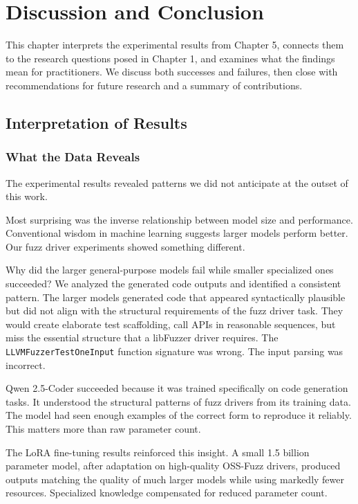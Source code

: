 
\chapter{Discussion and Conclusion}
\label{chap:discussion}

This chapter interprets the experimental results from Chapter 5, connects them to the research questions posed in Chapter 1, and examines what the findings mean for practitioners. We discuss both successes and failures, then close with recommendations for future research and a summary of contributions.


\section{Interpretation of Results}
\label{sec:discussion_interpretation}

\subsection{What the Data Reveals}
\label{sec:discussion_data}

The experimental results revealed patterns we did not anticipate at the outset of this work.

Most surprising was the inverse relationship between model size and performance. Conventional wisdom in machine learning suggests larger models perform better. Our fuzz driver experiments showed something different.

Why did the larger general-purpose models fail while smaller specialized ones succeeded? We analyzed the generated code outputs and identified a consistent pattern. The larger models generated code that appeared syntactically plausible but did not align with the structural requirements of the fuzz driver task. They would create elaborate test scaffolding, call APIs in reasonable sequences, but miss the essential structure that a libFuzzer driver requires. The \texttt{LLVMFuzzerTestOneInput} function signature was wrong. The input parsing was incorrect.

Qwen 2.5-Coder succeeded because it was trained specifically on code generation tasks. It understood the structural patterns of fuzz drivers from its training data. The model had seen enough examples of the correct form to reproduce it reliably. This matters more than raw parameter count.

The LoRA fine-tuning results reinforced this insight. A small 1.5 billion parameter model, after adaptation on high-quality OSS-Fuzz drivers, produced outputs matching the quality of much larger models while using markedly fewer resources. Specialized knowledge compensated for reduced parameter count.

